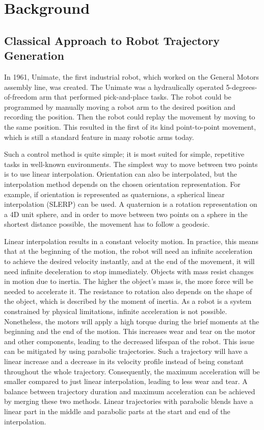 \section{Background}

\subsection{Classical Approach to Robot Trajectory Generation}
In 1961, Unimate, the first industrial robot, which worked on the General Motors assembly line, was created. The Unimate was a hydraulically operated 5-degrees-of-freedom arm that performed pick-and-place tasks. The robot could be programmed by manually moving a robot arm to the desired position and recording the position. Then the robot could replay the movement by moving to the same position. This resulted in the first of its kind point-to-point movement, which is still a standard feature in many robotic arms today. 

\bigskip \noindent
Such a control method is quite simple; it is most suited for simple, repetitive tasks in well-known environments. The simplest way to move between two points is to use linear interpolation. Orientation can also be interpolated, but the interpolation method depends on the chosen orientation representation. For example, if orientation is represented as quaternions, a spherical linear interpolation (SLERP) \cite{shoemake1985animating} can be used. A quaternion is a rotation representation on a 4D unit sphere, and in order to move between two points on a sphere in the shortest distance possible, the movement has to follow a geodesic. 

\bigskip \noindent
Linear interpolation results in a constant velocity motion. In practice, this means that at the beginning of the motion, the robot will need an infinite acceleration to achieve the desired velocity instantly, and at the end of the movement, it will need infinite deceleration to stop immediately. Objects with mass resist changes in motion due to inertia. The higher the object's mass is, the more force will be needed to accelerate it. The resistance to rotation also depends on the shape of the object, which is described by the moment of inertia. As a robot is a system constrained by physical limitations, infinite acceleration is not possible. Nonetheless, the motors will apply a high torque during the brief moments at the beginning and the end of the motion. This increases wear and tear on the motor and other components, leading to the decreased lifespan of the robot. This issue can be mitigated by using parabolic trajectories. Such a trajectory will have a linear increase and a decrease in its velocity profile instead of being constant throughout the whole trajectory. Consequently, the maximum acceleration will be smaller compared to just linear interpolation, leading to less wear and tear. A balance between trajectory duration and maximum acceleration can be achieved by merging these two methods. Linear trajectories with parabolic blends have a linear part in the middle and parabolic parts at the start and end of the interpolation.

